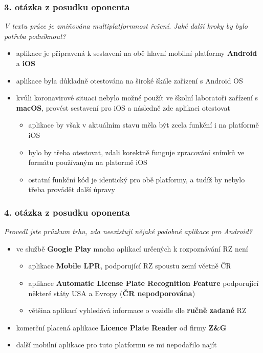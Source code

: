 \documentclass{beamer}
\begin{document}
\begin{frame}
\frametitle{3. otázka z posudku oponenta}
    \begingroup
    \fontsize{11pt}{12pt}\selectfont
    \textit{V textu práce je zmiňována multiplatformnost řešení. Jaké další kroky by bylo potřeba podniknout?}
    \endgroup
    \bigskip
    \begin{itemize}
        \item aplikace je připravená k sestavení na obě hlavní mobilní platformy \textbf{Android} a \textbf{iOS}
        \item aplikace byla důkladně otestována na široké škále zařízení s Android OS
        \item kvůli koronavirové situaci nebylo možné použít ve školní laboratoři zařízení s \textbf{macOS}, provést sestavení pro iOS a následně zde aplikaci otestovat 
        \begin{itemize}
            \item aplikace by však v aktuálním stavu měla být zcela funkční i na platformě iOS
            \item bylo by třeba otestovat, zdali korektně funguje zpracování snímků ve formátu používaným na platormě iOS 
            \item ostatní funkční kód je identický pro obě platformy, a tudíž by nebylo třeba provádět další úpravy 
        \end{itemize}
    \end{itemize}
\end{frame}

\begin{frame}
\frametitle{4. otázka z posudku oponenta}
    \begingroup
    \fontsize{11pt}{12pt}\selectfont
    \textit{Provedl jste průzkum trhu, zda neexistují nějaké podobné aplikace pro Android?}
    \endgroup
    \bigskip
    \begin{itemize}
        \item ve službě \textbf{Google Play} mnoho aplikací určených k rozpoznávání RZ není
            \begin{itemize}
                \item aplikace \textbf{Mobile LPR}, podporující RZ spoustu zemí včetně ČR
                \item aplikace \textbf{Automatic License Plate Recognition Feature} podporující některé státy USA a Evropy (\textbf{ČR nepodporována})
                \item většina aplikací vyhledává informace o vozidle dle \textbf{ručně zadané} RZ
            \end{itemize}
        \item komerční placená aplikace \textbf{Licence Plate Reader} od firmy \textbf{Z\&G}

        \item další mobilní aplikace pro tuto platformu se mi nepodařilo najít
    \end{itemize}
\end{frame}
\end{document}
